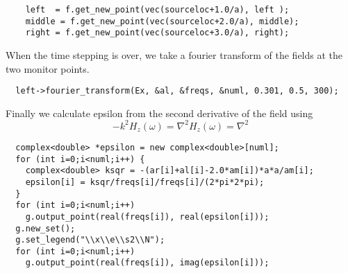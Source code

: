 \begin{verbatim}
    left  = f.get_new_point(vec(sourceloc+1.0/a), left );
    middle = f.get_new_point(vec(sourceloc+2.0/a), middle);
    right = f.get_new_point(vec(sourceloc+3.0/a), right);
\end{verbatim}
\begin{comment}
    f.step();
  }
  grace g("eps", dirname);
  complex<double> *al, *ar, *am, *freqs;
  int numl, numr;
  master_printf("Working on left fourier transform...\n");
\end{comment}
When the time stepping is over, we take a fourier transform of the fields
at the two monitor points.
\begin{verbatim}
  left->fourier_transform(Ex, &al, &freqs, &numl, 0.301, 0.5, 300);
\end{verbatim}
\begin{comment}
  delete[] freqs;
  master_printf("Working on middle fourier transform...\n");
  middle->fourier_transform(Ex, &am, &freqs, &numr, 0.301, 0.5, 300);
  delete[] freqs;
  master_printf("Working on right fourier transform...\n");
  right->fourier_transform(Ex, &ar, &freqs, &numr, 0.301, 0.5, 300);
  if (numl != numr)
     master_printf("Aaack you need both nums to be the same!\n");
  g.new_set();
  g.set_legend("\\x\\e\\s1\\N");
\end{comment}
Finally we calculate epsilon from the second derivative of the field using
\begin{equation*}
-k^2 H_z(\omega) = \nabla^2 H_z(\omega) = \nabla^2
\end{equation*}
\begin{verbatim}
  complex<double> *epsilon = new complex<double>[numl];
  for (int i=0;i<numl;i++) {
    complex<double> ksqr = -(ar[i]+al[i]-2.0*am[i])*a*a/am[i];
    epsilon[i] = ksqr/freqs[i]/freqs[i]/(2*pi*2*pi);
  } 
  for (int i=0;i<numl;i++)
    g.output_point(real(freqs[i]), real(epsilon[i]));
  g.new_set();
  g.set_legend("\\x\\e\\s2\\N");
  for (int i=0;i<numl;i++)
    g.output_point(real(freqs[i]), imag(epsilon[i]));
\end{verbatim}
\begin{comment}
  g.new_set();
  g.set_legend("analytic \\x\\e\\s1\\N");
  for (int i=0;i<numl;i++)
    g.output_point(real(freqs[i]),
                   real(f.analytic_epsilon(real(freqs[i]),vec(sourceloc+3.0/a))));
  g.new_set();
  g.set_legend("analytic \\x\\e\\s2\\N");
  for (int i=0;i<numl;i++)
    g.output_point(real(freqs[i]),
                   imag(f.analytic_epsilon(real(freqs[i]),vec(sourceloc+3.0/a))));
}
\end{comment}




